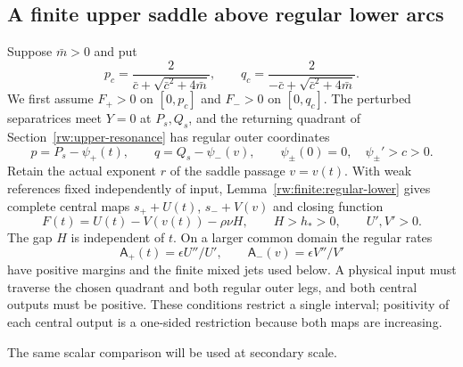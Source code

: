 \subsection{A finite upper saddle above regular lower arcs}
\label{rw:finite:upper-saddle-section}

Suppose $\bar m>0$ and put
\[
 p_c=\frac2{\bar c+\sqrt{\bar c^2+4\bar m}},\qquad
 q_c=\frac2{-\bar c+\sqrt{\bar c^2+4\bar m}}.
\]
We first assume $F_+>0$ on $[0,p_c]$ and $F_->0$ on
$[0,q_c]$. The perturbed separatrices meet $Y=0$ at
$P_s,Q_s$, and the returning quadrant of Section~\ref{rw:upper-resonance}
has regular outer coordinates
\[
 p=P_s-\psi_+(t),\qquad q=Q_s-\psi_-(v),
 \qquad \psi_\pm(0)=0,\quad\psi_\pm'>c>0.
\]
Retain the actual exponent $r$ of the saddle passage $v=v(t)$.
With weak references fixed independently of input,
Lemma~\ref{rw:finite:regular-lower} gives complete central maps
$s_++U(t)$, $s_-+V(v)$ and closing function
\begin{equation}\label{rw:finite:saddle-closing}
 F(t)=U(t)-V(v(t))-\rho\nu H,\qquad H>h_*>0,
 \qquad U',V'>0.
\end{equation}
The gap $H$ is independent of $t$. On a larger common domain the
regular rates
\[
 \mathsf A_+(t)=\epsilon U''/U',\qquad \mathsf A_-(v)=\epsilon V''/V'
\]
have positive margins and the finite mixed jets used below.
A physical input must traverse the chosen quadrant and both regular
outer legs, and both central outputs must be positive. These conditions
restrict a single interval; positivity of each central output is a
one-sided restriction because both maps are increasing.

The same scalar comparison will be used at secondary scale.

